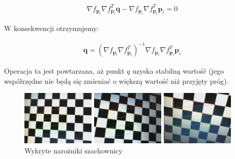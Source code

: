 \documentclass[oneside, eng]{mgr}
\newcommand{\bb}{\textbf}
\begin{document}
\begin{align*}
	\nabla f_{\bb{p}_i} \nabla f_{\bb{p}_i}^T \bb{q} - \nabla f_{\bb{p}_i} \nabla f_{\bb{p}_i}^T \bb{p}_i = 0
\end{align*}

W konsekwencji otrzymujemy:

\begin{align}
	\bb{q} = (\nabla f_{\bb{p}_i} \nabla f_{\bb{p}_i}^T)^{-1} \nabla f_{\bb{p}_i} \nabla f_{\bb{p}_i}^T \bb{p}_i
\end{align}

Operacja ta jest powtarzana, aż punkt $q$ uzyska stabilną wartość (jego współrzędne nie będą się zmieniać o większą wartość niż przyjęty próg).

\begin{figure}
\centering
		\begin{minipage}{3.5cm}
			\includegraphics[width=3.5cm]{img/left1.jpg}
		\end{minipage}
		\begin{minipage}{3.5cm}
			\includegraphics[width=3.5cm]{img/left10.jpg}
		\end{minipage}
		\begin{minipage}{3.5cm}
			\includegraphics[width=3.5cm]{img/left27.jpg}
		\end{minipage}
	\caption{Wykryte narożniki szachownicy}
	\label{fig:corners}
\end{figure}
\end{document}

